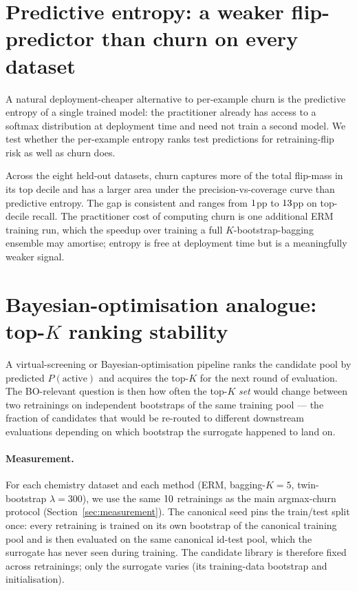 \section{Predictive entropy: a weaker flip-predictor than churn on every dataset}
\label{app:entropy}

A natural deployment-cheaper alternative to per-example churn is
the predictive entropy of a single trained model: the practitioner
already has access to a softmax distribution at deployment time and
need not train a second model.  We test whether the per-example
entropy ranks test predictions for retraining-flip risk as well as
churn does.



Across the eight held-out datasets, churn captures more of the
total flip-mass in its top decile and has a larger area under the
precision-vs-coverage curve than predictive entropy.  The gap is
consistent and ranges from $1$pp to $13$pp on top-decile recall.  The
practitioner cost of computing churn is one additional ERM
training run, which the speedup over training a full
$K$-bootstrap-bagging ensemble may amortise; entropy is free at
deployment time but is a meaningfully weaker signal.

\section{Bayesian-optimisation analogue: top-$K$ ranking stability}
\label{app:bo_topk}

A virtual-screening or Bayesian-optimisation pipeline ranks the
candidate pool by predicted $P(\text{active})$ and acquires the
top-$K$ for the next round of evaluation.  The BO-relevant question
is then how often the top-$K$ \emph{set} would change between two
retrainings on independent bootstraps of the same training pool ---
the fraction of candidates that would be re-routed to different
downstream evaluations depending on which bootstrap the surrogate
happened to land on.

\paragraph{Measurement.}
For each chemistry dataset and each method (ERM, bagging-$K{=}5$,
twin-bootstrap $\lambda{=}300$), we use the same $10$
retrainings as the main argmax-churn protocol
(Section~\ref{sec:measurement}).  The canonical seed pins the
train/test split once: every retraining is trained on its own
bootstrap of the canonical training pool and is then evaluated on
the same canonical id-test pool, which the surrogate has never seen
during training.  The candidate library is therefore fixed across
retrainings; only the surrogate varies (its training-data bootstrap
and initialisation).

